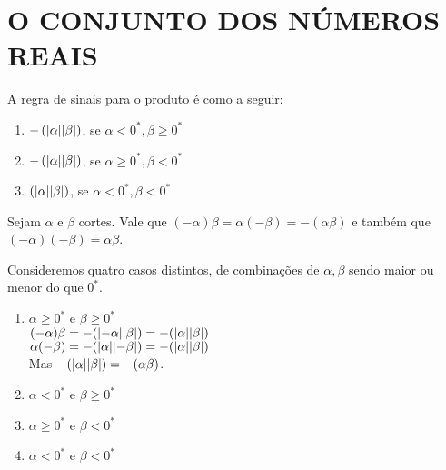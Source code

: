 \documentclass[../main.tex]{subfiles}
\begin{document}
\chapter{O CONJUNTO DOS NÚMEROS REAIS}
\label{cap-reais}
\begin{defi}
    A regra de sinais para o produto é como a seguir:
    \begin{enumerate}[label=(\roman*)]
        \item $-\left(\abs{\alpha}\abs{\beta}\right)$, se $\alpha < 0^*, \beta \geq 0^*$
        \item $-\left(\abs{\alpha}\abs{\beta}\right)$, se $\alpha \geq 0^*, \beta < 0^*$
        \item $\left(\abs{\alpha}\abs{\beta}\right)$, se $\alpha < 0^*, \beta < 0^*$
    \end{enumerate}
\end{defi}
\begin{prop}
    Sejam $\alpha$ e $\beta$ cortes. Vale que $\left( - \alpha \right) \beta = \alpha \left( -\beta \right) = -\left(\alpha \beta \right) $ e também que $\left( -\alpha \right) \left( -\beta \right) = \alpha \beta$.
\end{prop}
\begin{dem}
Consideremos quatro casos distintos, de combinações de $\alpha, \beta$ sendo maior ou menor do que $0^*$.
\begin{enumerate}
    \item $\alpha \geq 0^*$ e $\beta \geq 0^*$ \\
        $(-\alpha)\beta = -(\abs{-\alpha}\abs{\beta}) = -(\abs{\alpha}\abs{\beta})$ \\
        $\alpha(-\beta) = -(\abs{\alpha}\abs{-\beta}) = -(\abs{\alpha}\abs{\beta})$ \\
        Mas $-(\abs{\alpha}\abs{\beta}) = -(\alpha\beta)$.
        
    \item $\alpha < 0^*$ e $\beta \geq 0^*$
    
    \item $\alpha \geq 0^*$ e $\beta < 0^*$
    
    \item $\alpha < 0^*$ e $\beta < 0^*$
\end{enumerate}
\end{dem}
\end{document}
